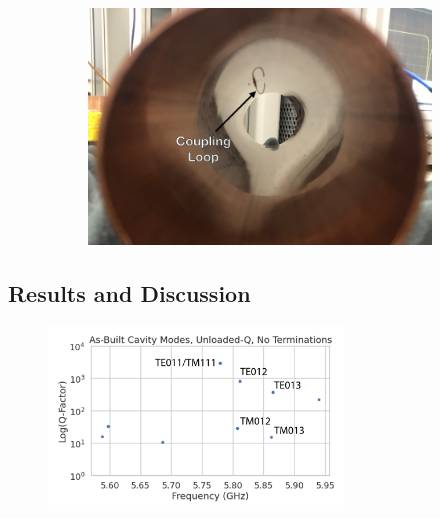 \begin{figure}[htbp]
\begin{subfigure}{0.48\textwidth}
        \includegraphics*[width=\textwidth]{figs/Chapter-6/230612_coupling_loop.png}
        \caption{}
    \end{subfigure}
    \caption{}
\end{figure}

\subsection{Results and Discussion}

\begin{figure}[htbp]
    \centering
    \includegraphics*[width=0.7\textwidth]{figs/Chapter-6/230612_simulated_toy_cav_no_term_modes_annotated.png}
    \caption{}
\end{figure}

